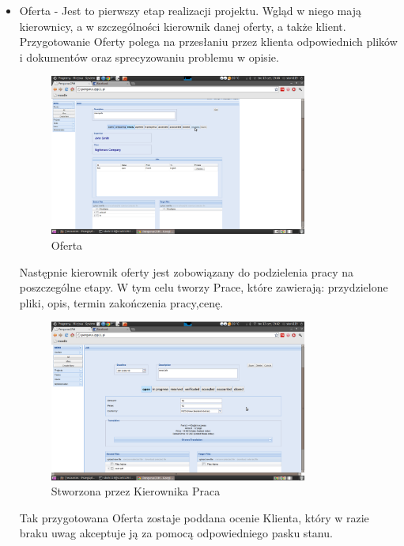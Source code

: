 \documentclass[licencjacka]{pracamgr}
\begin{document}
\begin{itemize}
\item Oferta - Jest to pierwszy etap realizacji projektu. Wgląd w niego mają kierownicy, a w szczególności kierownik danej oferty, a także klient.
Przygotowanie Oferty polega na przesłaniu przez klienta odpowiednich plików i dokumentów oraz sprecyzowaniu problemu w opisie.

\begin{figure}[h!]
\centering
\includegraphics[width=0.8\textwidth]{resources/quote.png}
\caption{Oferta}
\end{figure}

Następnie kierownik oferty jest zobowiązany do podzielenia pracy na poszczególne etapy. W tym celu tworzy Prace, które zawierają:
przydzielone pliki, opis, termin zakończenia pracy,cenę.

\begin{figure}[h!]
\centering
\includegraphics[width=0.8\textwidth]{resources/job.png}
\caption{Stworzona przez Kierownika Praca}
\end{figure}

Tak przygotowana Oferta zostaje poddana ocenie Klienta, który w razie braku uwag akceptuje ją za pomocą odpowiedniego pasku stanu.


\end{itemize}
\end{document}

